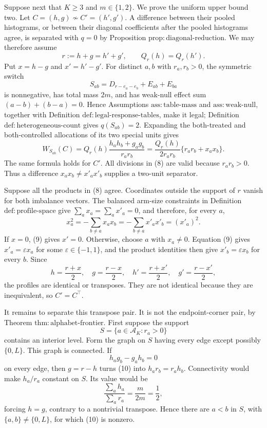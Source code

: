 Suppose next that \(K\geq3\) and \(m\in\{1,2\}\). We prove the uniform upper bound two. Let \(C=(h,g)\not\sim C'=(h',g')\). A difference between their pooled histograms, or between their diagonal coefficients after the pooled histograms agree, is separated with \(q=0\) by Proposition \(\mathrm{prop{:}diagonal\text{-}reduction}\). We may therefore assume
\[
r:=h+g=h'+g',
\qquad
Q_r(h)=Q_r(h'). \tag{6}
\]
Put \(x=h-g\) and \(x'=h'-g'\). For distinct \(a,b\) with \(r_a,r_b>0\), the symmetric switch
\[
S_{ab}=D_{r-e_a-e_b}+E_{ab}+E_{ba} \tag{7}
\]
is nonnegative, has total mass \(2m\), and has weak-null effect sum \((a-b)+(b-a)=0\). Hence Assumptions \(\mathrm{ass{:}table\text{-}mass}\) and \(\mathrm{ass{:}weak\text{-}null}\), together with Definition \(\mathrm{def{:}legal\text{-}response\text{-}tables}\), make it legal; Definition \(\mathrm{def{:}heterogeneous\text{-}count}\) gives \(q(S_{ab})=2\). Expanding the both-treated and both-controlled allocations of its two special units gives
\[
W_{S_{ab}}(C)
=Q_r(h)\frac{h_ah_b+g_ag_b}{r_ar_b}
=\frac{Q_r(h)}{2r_ar_b}\{r_ar_b+x_ax_b\}. \tag{8}
\]
The same formula holds for \(C'\). All divisions in (8) are valid because \(r_ar_b>0\). Thus a difference \(x_ax_b\neq x'_ax'_b\) supplies a two-unit separator.

Suppose all the products in (8) agree. Coordinates outside the support of \(r\) vanish for both imbalance vectors. The balanced arm-size constraints in Definition \(\mathrm{def{:}profile\text{-}space}\) give \(\sum_a x_a=\sum_a x'_a=0\), and therefore, for every \(a\),
\[
x_a^2=-\sum_{b\neq a}x_ax_b
=-\sum_{b\neq a}x'_ax'_b=(x'_a)^2. \tag{9}
\]
If \(x=0\), (9) gives \(x'=0\). Otherwise, choose \(a\) with \(x_a\neq0\). Equation (9) gives \(x'_a=\varepsilon x_a\) for some \(\varepsilon\in\{-1,1\}\), and the product identities then give \(x'_b=\varepsilon x_b\) for every \(b\). Since
\[
h=\frac{r+x}{2},\quad g=\frac{r-x}{2},\quad
h'=\frac{r+x'}{2},\quad g'=\frac{r-x'}{2},
\]
the profiles are identical or transposes. They are not identical because they are inequivalent, so \(C'=C^\top\).

It remains to separate this transpose pair. It is not the endpoint-corner pair, by Theorem \(\mathrm{thm{:}alphabet\text{-}frontier}\). First suppose the support
\[
S=\{a\in\mathcal A_K:r_a>0\}
\]
contains an interior level. Form the graph on \(S\) having every edge except possibly \(\{0,L\}\). This graph is connected. If
\[
h_ag_b-g_ah_b=0 \tag{10}
\]
on every edge, then \(g=r-h\) turns (10) into \(h_ar_b=r_ah_b\). Connectivity would make \(h_a/r_a\) constant on \(S\). Its value would be
\[
\frac{\sum_a h_a}{\sum_a r_a}=\frac{m}{2m}=\frac12,
\]
forcing \(h=g\), contrary to a nontrivial transpose. Hence there are \(a<b\) in \(S\), with \(\{a,b\}\neq\{0,L\}\), for which (10) is nonzero.

